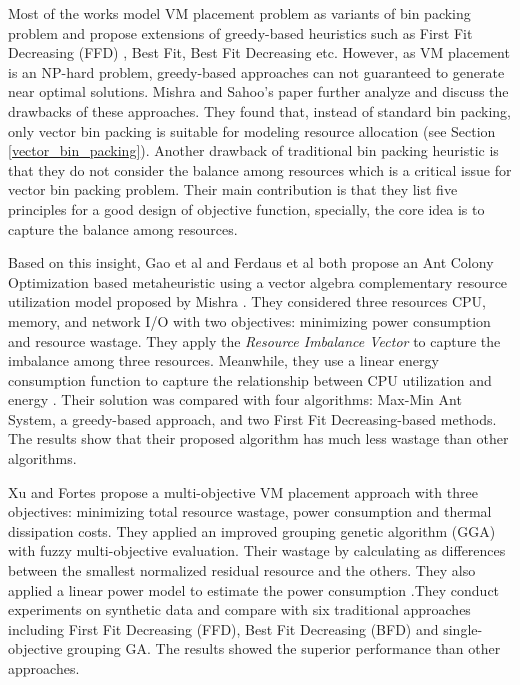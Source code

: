 Most of the works model VM placement problem as variants of bin packing problem and propose extensions of greedy-based heuristics such as First Fit Decreasing (FFD) \cite{Wood:2009tw}, Best Fit, Best Fit Decreasing \cite{Beloglazov:2010vm} etc. However, as VM placement is an NP-hard problem, greedy-based approaches can not guaranteed to generate near optimal solutions. Mishra and Sahoo's paper \cite{Mishra:2011bz} further analyze and discuss the drawbacks of these approaches. They found that, instead of standard bin packing, only vector bin packing is suitable for modeling resource allocation (see Section \ref{vector_bin_packing}). Another drawback of traditional bin packing heuristic is that they do not consider the balance among resources which is a critical issue for vector bin packing problem. Their main contribution is that they list five principles for a good design of objective function, specially, the core idea is to capture the balance among resources.

Based on this insight, Gao et al \cite{Gao:2013gg} and Ferdaus et al \cite{Ferdaus:2014ep} both propose an Ant Colony Optimization based metaheuristic using a vector algebra complementary resource utilization model proposed by Mishra \cite{Mishra:2011bz}. They considered three resources CPU, memory, and network I/O with two objectives: minimizing power consumption and resource wastage. They apply the \emph{Resource Imbalance Vector} to capture the imbalance among three resources. Meanwhile, they use a linear energy consumption function to capture the relationship between CPU utilization and energy \cite{Fan:2007jr}. Their solution was compared with four algorithms: Max-Min Ant System, a greedy-based approach, and two First Fit Decreasing-based methods. The results show that their proposed algorithm has much less wastage than other algorithms.

Xu and Fortes \cite{Xu:2010vh} propose a multi-objective VM placement approach with three objectives: minimizing total resource wastage, power consumption and thermal dissipation costs. They applied an improved grouping genetic algorithm (GGA) with fuzzy multi-objective evaluation. Their wastage by calculating as differences between the smallest normalized residual resource and the others. They also applied a linear power model to estimate the power consumption \cite{Lien:2007it}.They conduct experiments on synthetic data and compare with six traditional approaches including First Fit Decreasing (FFD), Best Fit Decreasing (BFD) and single-objective grouping GA. The results showed the superior performance than other approaches. 

